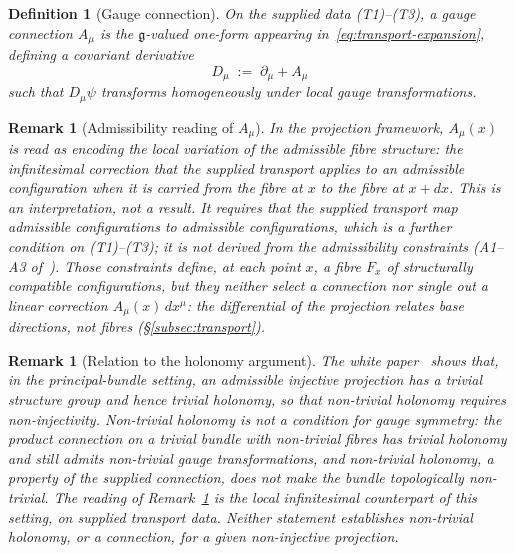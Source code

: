 \documentclass[11pt,a4paper]{article}
\newtheorem{definition}[theorem]{Definition}
\newtheorem{remark}[theorem]{Remark}
\begin{document}
    \begin{definition}[Gauge connection]
      \label{def:connection}
      On the supplied data (T1)--(T3), a \emph{gauge connection} $A_\mu$ is the $\mathfrak{g}$-valued
      one-form appearing in~\eqref{eq:transport-expansion}, defining a covariant derivative
      \begin{equation}
        \label{eq:covariant-derivative}
        D_\mu \;:=\; \partial_\mu + A_\mu
      \end{equation}
      such that $D_\mu\psi$ transforms homogeneously under local gauge
      transformations.
    \end{definition}

    \begin{remark}[Admissibility reading of $A_\mu$]
      \label{prop:connection-admissibility}
      In the projection framework, $A_\mu(x)$ is read as encoding the local variation of the
      admissible fibre structure: the infinitesimal correction that the supplied transport applies to
      an admissible configuration when it is carried from the fibre at $x$ to the fibre at $x + dx$.
      This is an interpretation, not a result.
      It requires that the supplied transport map admissible configurations to admissible
      configurations, which is a further condition on (T1)--(T3); it is not derived from the
      admissibility constraints (A1--A3 of~\cite{Beau2026m}).
      Those constraints define, at each point $x$, a fibre $F_x$ of structurally compatible
      configurations, but they neither select a connection nor single out a linear correction
      $A_\mu(x)\,dx^\mu$: the differential of the projection relates base directions, not fibres
      (§\ref{subsec:transport}).
    \end{remark}

    \begin{remark}[Relation to the holonomy argument]
        The white paper~\cite{Cosmochrony} shows that, in the principal-bundle setting, an
        admissible injective projection has a trivial structure group and hence trivial
        holonomy, so that non-trivial holonomy requires non-injectivity.
        Non-trivial holonomy is not a condition for gauge symmetry: the product connection on a
        trivial bundle with non-trivial fibres has trivial holonomy and still admits non-trivial
        gauge transformations, and non-trivial holonomy, a property of the supplied connection,
        does not make the bundle topologically non-trivial.
        The reading of Remark~\ref{prop:connection-admissibility} is the local infinitesimal
        counterpart of this setting, on supplied transport data.
        Neither statement establishes non-trivial holonomy, or a connection, for a given
        non-injective projection.
    \end{remark}
\end{document}
